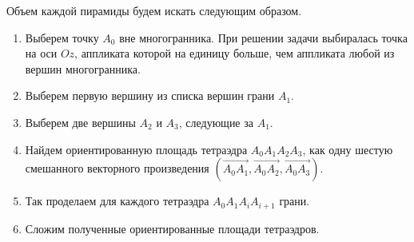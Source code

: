 \documentclass[a4paper,12pt, titlepage]{article}
\begin{document}
\newpage
Объем каждой пирамиды будем искать следующим образом.
\begin{enumerate}
\item Выберем точку $A_{0}$ вне многогранника. При решении задачи выбиралась точка на оси $Oz$, 
аппликата которой на единицу больше, чем аппликата любой из вершин многогранника.
\item Выберем первую вершину из списка вершин грани $A_{1}$. 
\item Выберем две вершины $A_{2}$ и $A_{3}$, следующие за $A_{1}$.
\item Найдем ориентированную площадь тетраэдра $A_{0}A_{1}A_{2}A_{3}$, как одну шестую смешанного векторного произведения
$(\overrightarrow{A_{0}A_{1}},\overrightarrow{A_{0}A_{2}},\overrightarrow{A_{0}A_{3}})$. 
\item Так проделаем для каждого тетраэдра $A_{0}A_{1}A_{i}A_{i+1}$ грани.
\item Сложим полученные ориентированные площади тетраэдров.
\end{enumerate}


\end{document}
